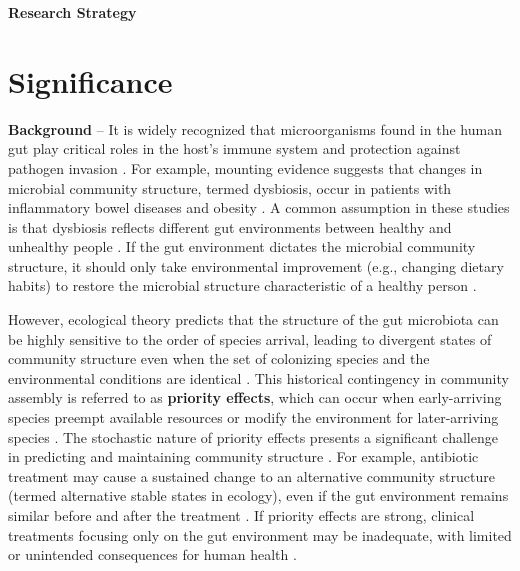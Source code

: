 \documentclass[12pt, class=article, crop=false]{standalone}
\begin{document}

\textbf{Research Strategy}

\section{Significance}

\textbf{Background} --
It is widely recognized that microorganisms found in the human gut play critical roles in the host's immune system and protection against pathogen invasion \citep{fierer_animalcules_2012, petersen_defining_2014, turroni_infant_2020}.
For example, mounting evidence suggests that changes in microbial community structure, termed dysbiosis, occur in patients with inflammatory bowel diseases \citep{frank_molecular-phylogenetic_2007, karlsson_gut_2013, abrahamsson_low_2014, parracho_differences_2005} and obesity \citep{costello_application_2012, ley_obesity_2005, turnbaugh_diet-induced_2008}.
A common assumption in these studies is that dysbiosis reflects different gut environments between healthy and unhealthy people \citep{fierer_animalcules_2012, petersen_defining_2014}.
If the gut environment dictates the microbial community structure, it should only take environmental improvement (e.g., changing dietary habits) to restore the microbial structure characteristic of a healthy person \citep{chase_community_2003, leibold_metacommunity_2004, fukami_historical_2015, hooper_how_2002, reese_thinking_2019}.

However, ecological theory predicts that the structure of the gut microbiota can be highly sensitive to the order of species arrival, leading to divergent states of community structure even when the set of colonizing species and the environmental conditions are identical \citep{fierer_animalcules_2012, david_host_2014, akagawa_effect_2019, ojima_priority_2022, debray_priority_2022}.
This historical contingency in community assembly is referred to as \textbf{priority effects}, which can occur when early-arriving species preempt available resources or modify the environment for later-arriving species \citep{fukami_historical_2015, ke_coexistence_2018, weidlich_priority_2021, sprockett_role_2018, debray_priority_2022}.
The stochastic nature of priority effects presents a significant challenge in predicting and maintaining community structure \citep{fukami_historical_2015}.
For example, antibiotic treatment may cause a sustained change to an alternative community structure (termed alternative stable states in ecology), even if the gut environment remains similar before and after the treatment \citep{dethlefsen_incomplete_2011, jakobsson_short-term_2010}.
If priority effects are strong, clinical treatments focusing only on the gut environment may be inadequate, with limited or unintended consequences for human health \citep{fierer_animalcules_2012, sprockett_role_2018}.
\end{document}
